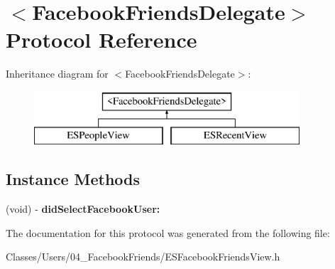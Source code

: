 \hypertarget{protocol_facebook_friends_delegate-p}{}\section{$<$Facebook\+Friends\+Delegate$>$ Protocol Reference}
\label{protocol_facebook_friends_delegate-p}
Inheritance diagram for $<$Facebook\+Friends\+Delegate$>$\+:\begin{figure}[H]
\begin{center}
\leavevmode
\includegraphics[height=2.000000cm]{protocol_facebook_friends_delegate-p}
\end{center}
\end{figure}
\subsection*{Instance Methods}
\begin{DoxyCompactItemize}
\item 
\hypertarget{protocol_facebook_friends_delegate-p_a935ce99ed3bd2b13c6e6eb4d974ad04e}{}(void) -\/ {\bfseries did\+Select\+Facebook\+User\+:}\label{protocol_facebook_friends_delegate-p_a935ce99ed3bd2b13c6e6eb4d974ad04e}

\end{DoxyCompactItemize}


The documentation for this protocol was generated from the following file\+:\begin{DoxyCompactItemize}
\item 
Classes/\+Users/04\+\_\+\+Facebook\+Friends/E\+S\+Facebook\+Friends\+View.\+h\end{DoxyCompactItemize}
